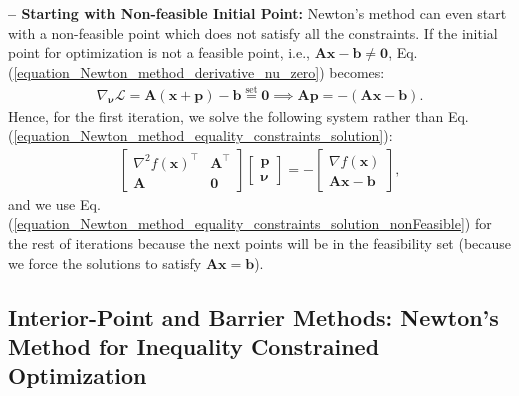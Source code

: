 \documentclass[lang=cn,10pt]{gorgeousnbook}
\numberwithin{equation}{section}%
\numberwithin{figure}{section}%
\begin{document}
\hfill\break
\textbf{-- Starting with Non-feasible Initial Point:}
Newton's method can even start with a non-feasible point which does not satisfy all the constraints.
If the initial point for optimization is not a feasible point, i.e., $\boldsymbol{Ax} - \boldsymbol{b} \neq \boldsymbol{0}$, Eq. (\ref{equation_Newton_method_derivative_nu_zero}) becomes:
\begin{align}
\nabla_{\boldsymbol{\nu}} \mathcal{L} = \boldsymbol{A} (\boldsymbol{x} + \boldsymbol{p}) - \boldsymbol{b}  \overset{\text{set}}{=} \boldsymbol{0} \implies \boldsymbol{Ap} = -(\boldsymbol{Ax} - \boldsymbol{b}).
\end{align}
Hence, for the first iteration, we solve the following system rather than Eq. (\ref{equation_Newton_method_equality_constraints_solution}):
\begin{align}\label{equation_Newton_method_equality_constraints_solution_nonFeasible}
\begin{bmatrix}
\nabla^2 f(\boldsymbol{x})^\top & \boldsymbol{A}^\top \\
\boldsymbol{A} & \boldsymbol{0}
\end{bmatrix}
\begin{bmatrix}
\boldsymbol{p} \\
\boldsymbol{\nu}
\end{bmatrix} 
=
-
\begin{bmatrix}
\nabla f(\boldsymbol{x}) \\
\boldsymbol{Ax} - \boldsymbol{b}
\end{bmatrix},
\end{align}
and we use Eq. (\ref{equation_Newton_method_equality_constraints_solution_nonFeasible}) for the rest of iterations because the next points will be in the feasibility set (because we force the solutions to satisfy $\boldsymbol{Ax} = \boldsymbol{b}$). 

\subsection{Interior-Point and Barrier Methods: Newton's Method for Inequality Constrained Optimization}\label{section_interior_point_method}
\end{document}
